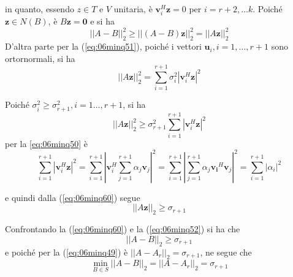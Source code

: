\begin{thproof}
in quanto, essendo 
$z \in  T$ e $V$ unitaria, \`e $\mathbf{v}_i^{H} 
\mathbf{z} = 0$ per $i = r + 2,\ldots k$.
Poich\'e $\mathbf{z} \in N(B)$, \`e $B\mathbf{z}= \mathbf{0}$
e si ha
\begin{equation}
\label{eq:06minq52}
||A - B||_{2}^{2} \geq || (A - B) \mathbf{z}||_{2}^{2} = 
|| A{\mathbf{z}}||_{2}^{2}
\end{equation} 
D'altra parte per la
(\ref{eq:06minq51}), poich\'e i vettori
$\mathbf{u}_{i}, i=1, \ldots, r+1$ sono ortornormali, si ha
\begin{equation}
\label{eq:06minq60}
|| A \mathbf{z}||_{2}^{2} = \displaystyle \sum_{i=1}^{r+1}
\sigma_i^{2} |\mathbf{v}_{i}^{H}\mathbf{z}|^{2}  
\end{equation}

Poich\'e $\sigma_{i}^{2} \geq \sigma^{2}_{r+1},
i =1 \ldots, r+1$, si ha
$$ || A \mathbf{z}||_2^{2} \geq \sigma_{r+1}^{2}
\displaystyle \sum_{i=1}^{r+1} |\mathbf{v}_{i}^{H} \mathbf{z}|^{2}
$$
per la
\ref{eq:06minq50} \`e
$$
\displaystyle \sum_{i=1}^{r+1}
|\mathbf{v}_i^{H} \mathbf{z}|^{2} =
\displaystyle \sum_{i=1}^{r+1}
\left|
\mathbf{v}_{i}^{H} \displaystyle \sum_{j=1}^{r+1}
\alpha_j \mathbf{v}_j
\right|^{2}
= \displaystyle \sum_{i=1}^{r+1}
\left|
\displaystyle \sum_{j=1}^{r+1} \alpha_j
\mathbf{v_i}^{H} 
 \mathbf{v}_{j}
\right|^{2}
=
\displaystyle
\sum_{i=1}^{r+1}|\alpha_i|^{2}
$$

e quindi dalla (\ref{eq:06minq60}) segue
\begin{equation}
  \label{eq:06minq61}
   || A\mathbf{z}||_{2} \geq \sigma_{r+1}
\end{equation}

Confrontando la 
 (\ref{eq:06minq60}) e
la (\ref{eq:06minq52})
si ha che
$$
|| A - B||_{2} \geq \sigma_{r+1}
$$
e poich\'e per la 
(\ref{eq:06minq49})
\`e $||A-A_{r}||_{2} = \sigma_{r+1}$, ne segue che
$$
\min_{B \in S} ||A - B||_{2} = ||A - A_r||_2 = \sigma_{r+1}
$$
\end{thproof}


